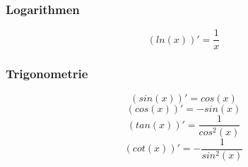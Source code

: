 \subsubsection{Logarithmen}
\[ \boxed{ (ln(x))' = \frac{1}{x} } \]  

\subsubsection{Trigonometrie}
\[ \boxed{ (sin(x))' = cos(x) } \]  
\[ \boxed{ (cos(x))' = -sin(x) } \] 
\[ \boxed{ (tan(x))' = \frac{1}{cos^2(x)} } \]  
\[ \boxed{ (cot(x))' = -\frac{1}{sin^2(x)} } \]
